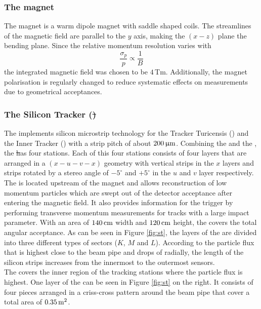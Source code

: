 \subsubsection{The magnet}
The \lhcb magnet \cite{magnet} is a warm dipole magnet with saddle shaped coils. The streamlines of the magnetic field are parallel to the $y$ axis, making the $(x-z)$ plane the bending plane. Since the relative momentum resolution varies with 
\begin{equation}
\frac{\sigma_p}{p} \propto \frac{1}{B}
\end{equation}
the integrated magnetic field was chosen to be $4\, $Tm. Additionally, the magnet polarisation is regularly changed to reduce systematic effects on measurements due to geometrical acceptances.

\subsubsection{The Silicon Tracker (\st)}
The \st \cite{it} implements silicon microstrip technology for the Tracker Turicensis (\ttracker) and the Inner Tracker (\intr) with a strip pitch of about $200 \,\upmu\rm m$. Combining the \ttracker and the \intr, the \st has four stations. Each of this four stations consists of four layers that are arranged in a $(x-u-v-x)$ geometry with vertical strips in the $x$ layers and strips rotated by a stereo angle of $-5^{\circ}$ and $+5^{\circ}$ in the $u$ and $v$ layer respectively.\\
The \ttracker is located upstream of the magnet and allows reconstruction of low momentum particles which are swept out of the detector acceptance after entering the magnetic field. It also provides information for the trigger by performing transverse momentum measurements for tracks with a large impact parameter.
With an area of $140 \rm \,cm$ width and $120 \rm \,cm$ height, the \ttracker covers the total \lhcb angular acceptance. As can be seen in Figure \ref{fig:st}, the layers of the \ttracker are divided into three different types of sectors ($K$, $M$ and $L$). According to the particle flux that is highest close to the beam pipe and drops of radially, the length of the silicon strips increases from the innermost to the outermost sensors.\\
The \intr covers the inner region of the tracking stations where the particle flux is highest. One layer of the \intr can be seen in Figure \ref{fig:st} on the right. It consists of four pieces arranged in a criss-cross pattern around the beam pipe that cover a total area of $0.35 \rm \,m^2$. 
